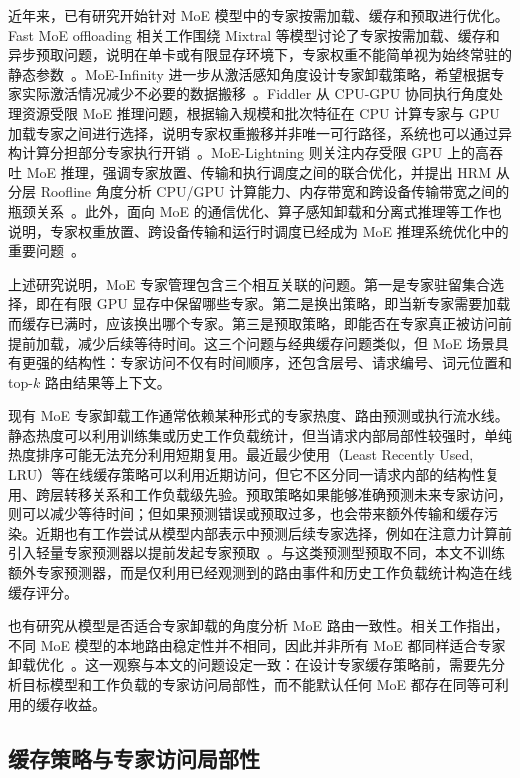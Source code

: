 近年来，已有研究开始针对 MoE 模型中的专家按需加载、缓存和预取进行优化。Fast MoE offloading 相关工作围绕 Mixtral 等模型讨论了专家按需加载、缓存和异步预取问题，说明在单卡或有限显存环境下，专家权重不能简单视为始终常驻的静态参数~\cite{eliseev2023offloading}。MoE-Infinity 进一步从激活感知角度设计专家卸载策略，希望根据专家实际激活情况减少不必要的数据搬移~\cite{xue2024moeinfinity}。Fiddler 从 CPU-GPU 协同执行角度处理资源受限 MoE 推理问题，根据输入规模和批次特征在 CPU 计算专家与 GPU 加载专家之间进行选择，说明专家权重搬移并非唯一可行路径，系统也可以通过异构计算分担部分专家执行开销~\cite{kamahori2024fiddler}。MoE-Lightning 则关注内存受限 GPU 上的高吞吐 MoE 推理，强调专家放置、传输和执行调度之间的联合优化，并提出 HRM 从分层 Roofline 角度分析 CPU/GPU 计算能力、内存带宽和跨设备传输带宽之间的瓶颈关系~\cite{cao2025moelightning}。此外，面向 MoE 的通信优化、算子感知卸载和分离式推理等工作也说明，专家权重放置、跨设备传输和运行时调度已经成为 MoE 推理系统优化中的重要问题~\cite{mei2025moecomm,zhang2025operatorawareoffload,sun2026pddisaggmoe}。

上述研究说明，MoE 专家管理包含三个相互关联的问题。第一是专家驻留集合选择，即在有限 GPU 显存中保留哪些专家。第二是换出策略，即当新专家需要加载而缓存已满时，应该换出哪个专家。第三是预取策略，即能否在专家真正被访问前提前加载，减少后续等待时间。这三个问题与经典缓存问题类似，但 MoE 场景具有更强的结构性：专家访问不仅有时间顺序，还包含层号、请求编号、词元位置和 top-$k$ 路由结果等上下文。

现有 MoE 专家卸载工作通常依赖某种形式的专家热度、路由预测或执行流水线。静态热度可以利用训练集或历史工作负载统计，但当请求内部局部性较强时，单纯热度排序可能无法充分利用短期复用。最近最少使用（Least Recently Used, LRU）等在线缓存策略可以利用近期访问，但它不区分同一请求内部的结构性复用、跨层转移关系和工作负载级先验。预取策略如果能够准确预测未来专家访问，则可以减少等待时间；但如果预测错误或预取过多，也会带来额外传输和缓存污染。近期也有工作尝试从模型内部表示中预测后续专家选择，例如在注意力计算前引入轻量专家预测器以提前发起专家预取~\cite{zhu2025preattention}。与这类预测型预取不同，本文不训练额外专家预测器，而是仅利用已经观测到的路由事件和历史工作负载统计构造在线缓存评分。

也有研究从模型是否适合专家卸载的角度分析 MoE 路由一致性。相关工作指出，不同 MoE 模型的本地路由稳定性并不相同，因此并非所有 MoE 都同样适合专家卸载优化~\cite{liang2026notallmodels}。这一观察与本文的问题设定一致：在设计专家缓存策略前，需要先分析目标模型和工作负载的专家访问局部性，而不能默认任何 MoE 都存在同等可利用的缓存收益。

\subsection{缓存策略与专家访问局部性}

